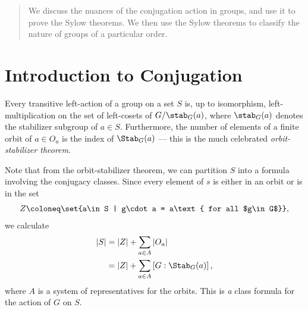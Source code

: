 \documentclass[10pt]{mypackage}
\begin{document}
\RaggedRight
\begin{abstract}
  \noindent We discuss the nuances of the conjugation action in groups, and use it to prove the Sylow theorems. We then use the Sylow theorems to classify the nature of groups of a particular order.
\end{abstract}
\section{Introduction to Conjugation}%
Every transitive left-action of a group on a set $S$ is, up to isomorphism, left-multiplication on the set of left-cosets of $G/\stab_G(a)$, where $\stab_G(a)$ denotes the stabilizer subgroup of $a\in S$. Furthermore, the number of elements of a finite orbit of $a\in O_a$ is the index of $\Stab_G(a)$ --- this is the much celebrated \textit{orbit-stabilizer theorem}.\newline

Note that from the orbit-stabilizer theorem, we can partition $S$ into a formula involving the conjugacy classes. Since every element of $s$ is either in an orbit or is in the set
\begin{align*}
  Z\coloneq \set{a\in S | g\cdot a = a\text{ for all $g\in G$}},
\end{align*}
we calculate
\begin{align*}
  \left\vert S \right\vert &= \left\vert Z \right\vert + \sum_{a\in A} \left\vert O_a \right\vert\\
                           &= \left\vert Z \right\vert + \sum_{a\in A} \left[ G:\Stab_G(a) \right],
\end{align*}
where $A$ is a system of representatives for the orbits. This is \textsl{a} class formula for the action of $G$ on $S$.\newline
\end{document}
